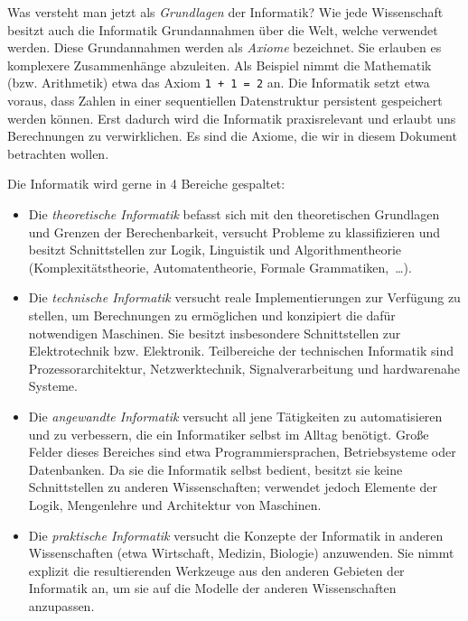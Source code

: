Was versteht man jetzt als \emph{Grundlagen} der Informatik? Wie jede
Wissenschaft besitzt auch die Informatik Grundannahmen über die Welt,
welche verwendet werden. Diese Grundannahmen werden als \emph{Axiome} bezeichnet.
Sie erlauben es komplexere Zusammenhänge abzuleiten. Als Beispiel nimmt
die Mathematik (bzw. Arithmetik) etwa das Axiom \verb!1 + 1 = 2! an.
Die Informatik setzt etwa voraus, dass Zahlen in einer sequentiellen
Datenstruktur persistent gespeichert werden können. Erst dadurch wird die
Informatik praxisrelevant und erlaubt uns Berechnungen zu verwirklichen.
Es sind die Axiome, die wir in diesem Dokument betrachten wollen.

Die Informatik wird gerne in 4 Bereiche gespaltet:
\begin{itemize}
 \item Die \emph{theoretische Informatik} befasst sich mit
        den theoretischen Grundlagen und Grenzen der Berechenbarkeit,
        versucht Probleme zu klassifizieren und besitzt Schnittstellen
        zur Logik, Linguistik und Algorithmentheorie
        (Komplexitätstheorie, Automatentheorie, Formale Grammatiken,~\dots).
 \item Die \emph{technische Informatik} versucht
        reale Implementierungen zur Verfügung zu stellen, um Berechnungen
        zu ermöglichen und konzipiert die dafür notwendigen Maschinen.
        Sie besitzt insbesondere Schnittstellen zur Elektrotechnik bzw.
        Elektronik. Teilbereiche der technischen Informatik sind
        Prozessorarchitektur, Netzwerktechnik, Signalverarbeitung und
        hardwarenahe Systeme.
 \item Die \emph{angewandte Informatik} versucht all jene Tätigkeiten
        zu automatisieren und zu verbessern, die ein Informatiker
        selbst im Alltag benötigt. Große Felder dieses Bereiches sind
        etwa Programmiersprachen, Betriebsysteme oder Datenbanken. Da
        sie die Informatik selbst bedient, besitzt sie keine
        Schnittstellen zu anderen Wissenschaften; verwendet jedoch
        Elemente der Logik, Mengenlehre und Architektur von Maschinen.
  \item Die \emph{praktische Informatik} versucht die Konzepte der
        Informatik in anderen Wissenschaften (etwa Wirtschaft, Medizin,
        Biologie) anzuwenden. Sie nimmt explizit die resultierenden
        Werkzeuge aus den anderen Gebieten der Informatik an, um sie auf
        die Modelle der anderen Wissenschaften anzupassen.
\end{itemize}
